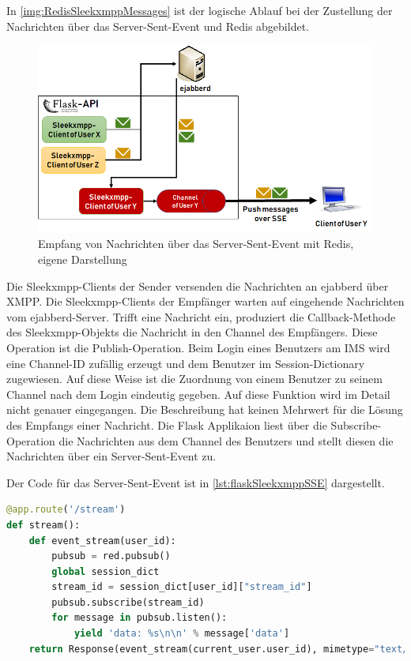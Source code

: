 \documentclass[a4paper,titlepage,halfparskip,12pt]{scrreprt}
\begin{document}
\begin{onehalfspacing}
In \autoref{img:RedisSleekxmppMessages} ist der logische Ablauf bei der Zustellung der Nachrichten über das Server-Sent-Event und Redis abgebildet.

\begin{figure}[h]
	\centering
	\includegraphics[width=\textwidth]{images/RedisSleekxmppMessages}
	\caption{Empfang von Nachrichten über das Server-Sent-Event mit Redis, eigene Darstellung}
	\label{img:RedisSleekxmppMessages}
\end{figure}

Die Sleekxmpp-Clients der Sender versenden die Nachrichten an ejabberd über \acs{XMPP}. Die Sleekxmpp-Clients der Empfänger warten auf eingehende Nachrichten vom ejabberd-Server. Trifft eine Nachricht ein, produziert die Callback-Methode des Sleekxmpp-Objekts die Nachricht in den Channel des Empfängers. Diese Operation ist die Publish-Operation. Beim Login eines Benutzers am \acs{IMS} wird eine Channel-ID zufällig erzeugt und dem Benutzer im Session-Dictionary zugewiesen. Auf diese Weise ist die Zuordnung von einem Benutzer zu seinem Channel nach dem Login eindeutig gegeben. Auf diese Funktion wird im Detail nicht genauer eingegangen. Die Beschreibung hat keinen Mehrwert für die Lösung des Empfangs einer Nachricht. Die Flask Applikaion liest über die Subscribe-Operation die Nachrichten aus dem Channel des Benutzers und stellt diesen die Nachrichten über ein Server-Sent-Event zu.

\pagebreak

Der Code für das Server-Sent-Event ist in \autoref{lst:flaskSleekxmppSSE} dargestellt.

\begin{lstlisting}[language=python, caption={Code des Server-Sent-Events für den Empfang von Nachrichten über ejabberd}, label={lst:flaskSleekxmppSSE}]
@app.route('/stream')
def stream():
    def event_stream(user_id):
        pubsub = red.pubsub()
        global session_dict
        stream_id = session_dict[user_id]["stream_id"]
        pubsub.subscribe(stream_id)
        for message in pubsub.listen():
            yield 'data: %s\n\n' % message['data']
    return Response(event_stream(current_user.user_id), mimetype="text/event-stream", status=200)
\end{lstlisting}


\end{onehalfspacing}
\end{document}
